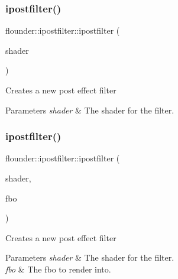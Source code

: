 \subsubsection{\texorpdfstring{ipostfilter()}{ipostfilter()}\hspace{0.1cm}{\footnotesize\ttfamily [3/4]}}
{\footnotesize\ttfamily flounder\+::ipostfilter\+::ipostfilter (\begin{DoxyParamCaption}\item[{\hyperlink{classflounder_1_1shader}{shader} $\ast$}]{shader }\end{DoxyParamCaption})}



Creates a new post effect filter 


\begin{DoxyParams}{Parameters}
{\em shader} & The shader for the filter. \\
\hline
\end{DoxyParams}
\mbox{\label{classflounder_1_1ipostfilter_a45622b81739ebad815b69526a878b054}} 
\subsubsection{\texorpdfstring{ipostfilter()}{ipostfilter()}\hspace{0.1cm}{\footnotesize\ttfamily [4/4]}}
{\footnotesize\ttfamily flounder\+::ipostfilter\+::ipostfilter (\begin{DoxyParamCaption}\item[{\hyperlink{classflounder_1_1shader}{shader} $\ast$}]{shader,  }\item[{fbo $\ast$}]{fbo }\end{DoxyParamCaption})}



Creates a new post effect filter 


\begin{DoxyParams}{Parameters}
{\em shader} & The shader for the filter. \\
\hline
{\em fbo} & The fbo to render into. \\
\hline
\end{DoxyParams}
\mbox{\label{classflounder_1_1ipostfilter_aca15b2f21a5f07ddcff5dcad764e137c}} 
